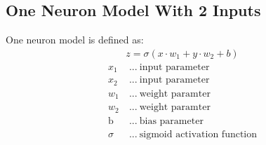 \documentclass{article}
\begin{document}
\subsection{One Neuron Model With 2 Inputs}
One neuron model is defined as:  
\begin{align}
    z  = \sigma(x \cdot w_1 + y \cdot w_2 + b) 
\end{align}
\begin{align*}
    \text{$x_1$}  \: &\text{...} \: \text{input parameter}\\
    \text{$x_2$}  \: &\text{...} \: \text{input parameter}\\
    \text{$w_1$}  \: &\text{...} \: \text{weight paramter}\\
    \text{$w_2$}  \: &\text{...} \: \text{weight paramter}\\
    \text{b}  \: &\text{...} \: \text{bias parameter}\\
    \sigma    \: &\text{...} \: \text{sigmoid activation function}
\end{align*}
\begin{center}
\def\d{2}
\end{center}
\end{document}
